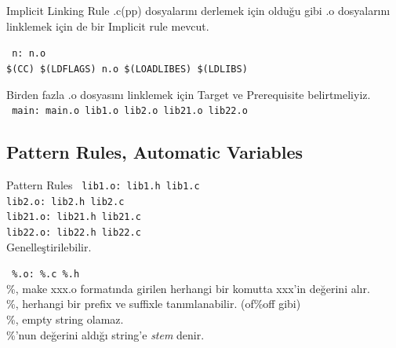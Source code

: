 \documentclass{beamer}
\begin{document}
\begin{frame}
    {Implicit Linking Rule}
    .c(pp) dosyalarını derlemek için olduğu gibi .o dosyalarını linklemek için de bir Implicit rule mevcut.\\
    \vspace{5mm}

    \texttt{%
        n: n.o\\
        \hspace{10mm} \$(CC) \$(LDFLAGS) n.o \$(LOADLIBES) \$(LDLIBS)\\
        }

        Birden fazla .o dosyasını linklemek için Target ve Prerequisite belirtmeliyiz.\\
    \vspace{5mm}
    \texttt{%
        main: main.o lib1.o lib2.o lib21.o lib22.o\\
        }
        
\end{frame}

\subsection{Pattern Rules, Automatic Variables}
\begin{frame}
    {Pattern Rules}
    \texttt{%
        lib1.o: lib1.h lib1.c\\
        lib2.o: lib2.h lib2.c\\
        lib21.o: lib21.h lib21.c\\
        lib22.o: lib22.h lib22.c\\
        }
        \vspace{5mm}
        Genelleştirilebilir.

\end{frame}

\begin{frame}
    \texttt{%
        \%.o: \%.c \%.h\\
        }
        \vspace{5mm}
        \%, make xxx.o formatında girilen herhangi bir komutta xxx'in değerini alır.\\
        \%, herhangi bir prefix ve suffixle tanımlanabilir. (of\%off gibi)\\
        \%, empty string olamaz.\\
        \%'nun değerini aldığı string'e \textit{stem} denir.


\end{frame}
\end{document}
